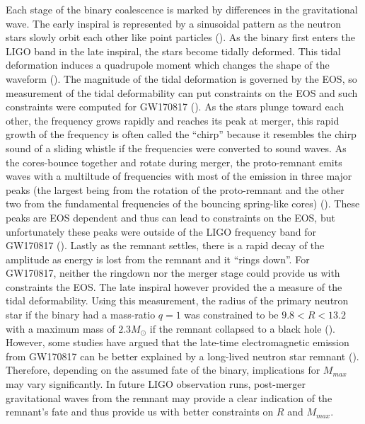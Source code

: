 Each stage of the binary coalescence is marked by differences in the gravitational wave. The early inspiral is represented by a sinusoidal pattern as the neutron stars slowly orbit each other like point particles (\cite{bauswein2019spectral}). As the binary first enters the LIGO band in the late inspiral, the stars become tidally deformed. This tidal deformation induces a quadrupole moment which changes the shape of the waveform (\cite{hinderer2010tidal}). The magnitude of the tidal deformation is governed by the EOS, so measurement of the tidal deformability can put constraints on the EOS and such constraints were computed for GW170817 (\cite{raithel2019constraints}). As the stars plunge toward each other, the frequency grows rapidly and reaches its peak at merger, this rapid growth of the frequency is often called the ``chirp'' because it resembles the chirp sound of a sliding whistle if the frequencies were converted to sound waves. As the cores-bounce together and rotate during merger, the proto-remnant emits waves with a multiltude of frequencies with most of the emission in three major peaks (the largest being from the rotation of the proto-remnant and the other two from the fundamental frequencies of the bouncing spring-like cores) (\cite{takami:2015}). These peaks are EOS dependent and thus can lead to constraints on the EOS, but unfortunately these peaks were outside of the LIGO frequency band for GW170817 (\cite{Abbott:2017dke}). Lastly as the remnant settles, there is a rapid decay of the amplitude as energy is lost from the remnant and it ``rings down''. For GW170817, neither the ringdown nor the merger stage could provide us with constraints the EOS. The late inspiral however provided the a measure of the tidal deformability. Using this measurement, the radius of the primary neutron star if the binary had a mass-ratio $q=1$ was constrained to be $9.8 < R < 13.2$ with a maximum mass of $2.3M_\odot$ if the remnant collapsed to a black hole (\cite{raithel2019constraints}). However, some studies have argued that the late-time electromagnetic emission from GW170817 can be better explained by a long-lived neutron star remnant (\cite{yu2018long}).  Therefore, depending on the assumed fate of the binary, implications for $M_{max}$ may vary significantly. In future LIGO observation runs, post-merger gravitational waves from the remnant may provide a clear indication of the remnant’s fate and thus provide us with better constraints on $R$ and $M_{max}$.

